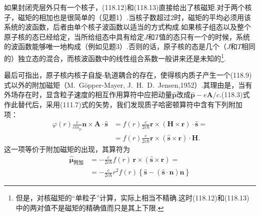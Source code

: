 如果封闭壳层外只有一个核子，(118.12)和(118.13)直接给出了核磁矩.对于两个核子，磁矩的相加也是很简单的（见题1）.当核子数超过2时，磁矩的平均必须用该系统的波函数，后者由单个核子波函数以适当的方式构成.如果核子组态以及整个原子核的态已经给定，当所给组态中具有给定$J$和$T$值的态只有一个的时候，系统的波函数能够唯一地构成（例如见题3）.否则的话，原子核的态是几个（$J$和$T$相同的）独立态的混合，而核波函数中的线性组合系数一般讲来还是未知的\footnote{但是，对核磁矩的“单粒子”计算，实际上相当不精确.这时(118.12)和(118.13)中的两对值不是磁矩的精确值而只是其上下限.}.

最后可指出，原子核内核子自旋-轨道耦合的存在，使得核内质子产生一个(118.9)式以外的附加磁矩（M.~G\"opper-Mayer, J.~H.~D.~Jensen,1952）.其理由是，当有外场存在时，显含粒子速度的相互作用算符中应把动量$\hat{\boldsymbol{p}}$改成$\hat{\boldsymbol{p}}-e\boldsymbol{A}/c$.(118.3)式作此替代后，采用(111.7)式的矢势，我们发现质子哈密顿算符中含有下列附加项：
\begin{equation*}
\begin{aligned}
  \varphi(r)\frac{e}{cm_\mathrm{p}}\boldsymbol{n}\times\boldsymbol{A}\cdot\hat{\boldsymbol{s}}
  &=f(r)\frac{e}{2c\hbar}\boldsymbol{r}\times(\boldsymbol{H}\times\boldsymbol{r})\cdot\hat{\boldsymbol{s}}=\\
  &=f(r)\frac{e}{2c\hbar}\boldsymbol{r}\times(\hat{\boldsymbol{s}}\times\boldsymbol{r})\cdot\boldsymbol{H}.
\end{aligned}
\end{equation*}
这一项等价于附加磁矩的出现，其算符为
\begin{equation}
\begin{aligned}
  \hat{\boldsymbol{\mu}}_{\text{附加}}
  &=-\frac{e}{2c\hbar}f(r)\,\boldsymbol{r}\times(\hat{\boldsymbol{s}}\times\boldsymbol{r})=\\
  &=-\frac{e}{2c\hbar}r^2f(r)\left\{\hat{\boldsymbol{s}}-(\hat{\boldsymbol{s}}\cdot\boldsymbol{n})\boldsymbol{n}\right\}
\end{aligned}
\end{equation}

